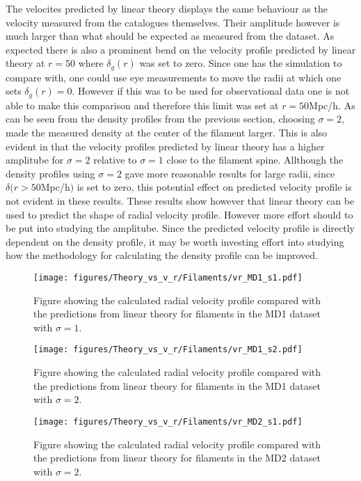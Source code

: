 The velocites predicted by linear theory displays the same behaviour as the velocity measured from the catalogues themselves. Their amplitude however is much larger than what should be expected as measured from the dataset. As expected there is also a prominent bend on the velocity profile predicted by linear theory at $r=50$ where $\delta_g(r)$ was set to zero. Since one has the simulation to compare with, one could use eye measurements to move the radii at which one sets $\delta_g(r)=0$. However if this was to be used for observational data one is not able to make this comparison and therefore this limit was set at $r=50$Mpc/h. As can be seen from the density profiles from the previous section, choosing $\sigma=2$, made the measured density at the center of the filament larger. This is also evident in that the velocity profiles predicted by linear theory has a higher amplitube for $\sigma=2$ relative to $\sigma=1$ close to the filament spine. Allthough the density profiles using $\sigma=2$ gave more reasonable results for large radii, since $\delta(r>50$Mpc/h$)$ is set to zero, this potential effect on predicted velocity profile is not evident in these results. These results show however that linear theory can be used to predict the shape of radial velocity profile. However more effort should to be put into studying the amplitube. Since the predicted velocity profile is directly dependent on the density profile, it may be worth investing effort into studying how the methodology for calculating the density profile can be improved. 


\begin{figure}[H]
    \texttt{[image: figures/Theory\_vs\_v\_r/Filaments/vr\_MD1\_s1.pdf]}
    \caption{Figure showing the calculated radial velocity profile compared with the predictions from linear theory for filaments in the MD1 dataset with $\sigma=1$.}
    \label{fig:filvrMD1s1}
\end{figure}

\begin{figure}[H]
    \texttt{[image: figures/Theory\_vs\_v\_r/Filaments/vr\_MD1\_s2.pdf]}
    \caption{Figure showing the calculated radial velocity profile compared with the predictions from linear theory for filaments in the MD1 dataset with $\sigma=2$.}
    \label{fig:filvrMD1s2}
\end{figure}

\begin{figure}[H]
    \texttt{[image: figures/Theory\_vs\_v\_r/Filaments/vr\_MD2\_s1.pdf]}
    \caption{Figure showing the calculated radial velocity profile compared with the predictions from linear theory for filaments in the MD2 dataset with $\sigma=2$.}
    \label{fig:filvrMD2s1}
\end{figure}

